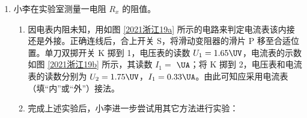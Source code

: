 \documentclass[\gkver]{gaokaozhenti}
\begin{document}
\begin{enumerate}
\begin{enumerate}
	\item
	观察到较模糊的干涉条纹，要使条纹变得清晰，值得尝试的是 。（单选）

	（A）旋转测量头　　（B）增大单缝与双缝间的距离　　（C）调节拨杆使单缝与双缝平行
	\item
	要增大观察到的条纹间距，正确的做法是 （单选）

	（A）减小单缝与光源间的距离　　（B）减小单缝与双缝间的距离

	（C）增大透镜与单缝间的距离　　（D）增大双缝与测量头间的距离
\end{enumerate}



\item
小李在实验室测量一电阻 $R_x$ 的阻值。

\begin{enumerate}
	\item
	因电表内阻未知，用如图 \ref{2021浙江19a} 所示的电路来判定电流表该内接还是外接。正确连线后，合上开关 S，将滑动变阻器的滑片 P 移至合适位置。单刀双掷开关 K 掷到 1，电压表的读数 $U_1=1.65\UV$，电流表的示数如图 \ref{2021浙江19b} 所示，其读数 $I_1=$ $\UA$；将 K 掷到 2，电压表和电流表的读数分别为 $U_2=1.75\UV$，$I_1=0.33\UA$。由此可知应采用电流表 （填“内”或“外”）接法。
	\item
	完成上述实验后，小李进一步尝试用其它方法进行实验：
\end{enumerate}


\end{enumerate}
\end{document}
